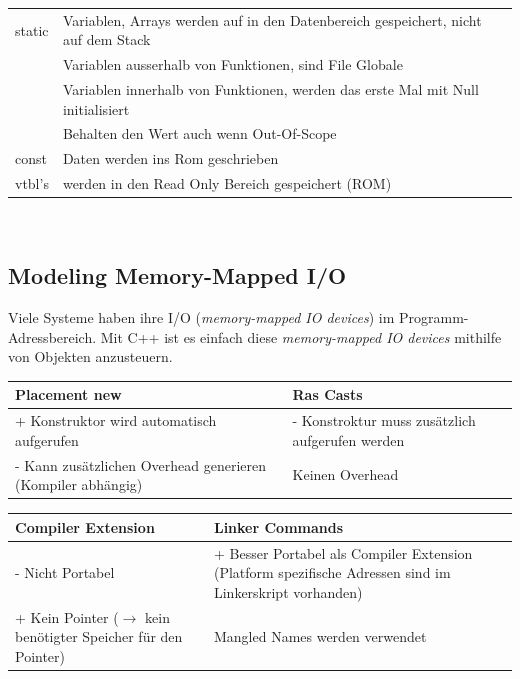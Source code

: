 \begin{tabular}{l|l}
\hline
   static   & Variablen, Arrays werden auf in den Datenbereich gespeichert, nicht auf dem Stack\\
            & Variablen ausserhalb von Funktionen, sind File Globale\\
            & Variablen innerhalb von Funktionen, werden das erste Mal mit Null initialisiert\\
            &  Behalten den Wert auch wenn Out-Of-Scope\\ \hline
    const   & Daten werden ins Rom geschrieben \\
    vtbl's  & werden in den Read Only Bereich gespeichert (ROM)
\end{tabular}\\




\subsection{Modeling Memory-Mapped I/O}
Viele Systeme haben ihre I/O (\textit{memory-mapped IO devices}) im Programm-Adressbereich.
Mit C++ ist es einfach diese \textit{memory-mapped IO devices} mithilfe von Objekten anzusteuern.

\begin{tabular}{|p{9.2cm}|p{9.2cm}|}
    \hline
    Placement new   &   Ras Casts\\
    \hline \hline
    + Konstruktor wird automatisch aufgerufen & - Konstroktur muss zusätzlich aufgerufen werden \\
    - Kann zusätzlichen Overhead generieren (Kompiler abhängig) & Keinen Overhead\\ \hline
\end{tabular}

\vspace{0.5cm}

\begin{tabular}{|p{9.2cm}|p{9.2cm}|}
    \hline
    Compiler Extension     &   Linker Commands \\
    \hline\hline
    - Nicht Portabel & + Besser Portabel als Compiler Extension (Platform spezifische Adressen sind im Linkerskript vorhanden) \\
    + Kein Pointer \newline ($\rightarrow$ kein benötigter Speicher für den Pointer) & Mangled Names werden verwendet\\
    \hline
\end{tabular}

